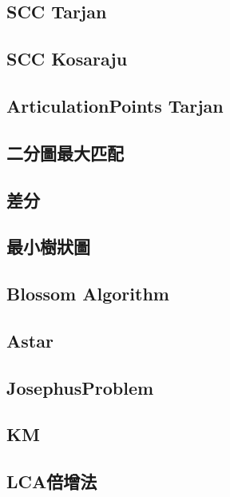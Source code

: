     \subsection{SCC Tarjan}
        
    \subsection{SCC Kosaraju}
        
    \subsection{ArticulationPoints Tarjan}
        
    \subsection{二分圖最大匹配}
        
    \subsection{差分}
        
    \subsection{最小樹狀圖}
        
    \subsection{Blossom Algorithm}
        
    \subsection{Astar}
        
    \subsection{JosephusProblem}
        
    \subsection{KM}
        
    \subsection{LCA倍增法}
        
